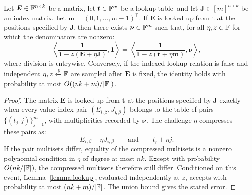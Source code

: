 \begin{corollary}
Let $\bm{E} \in {\mathbb{F}}^{n\times k}$ be a matrix, let
$\bm{t} \in {\mathbb{F}}^m$ be a lookup table, and let
$\bm{J} \in [m]^{n\times k}$ be an index matrix.
Let $\bm{m}=(0,1,\ldots,m-1)^\top$.  If $\bm{E}$ is looked up from
$\bm{t}$ at the positions specified by $\bm{J}$, then there exists
$\bm{\nu} \in {\mathbb{F}}^m$ such that, for all $\eta,z\in{\mathbb{F}}$ for which the
denominators are nonzero:
\[
    \left\langle
    \frac{\bm{1}}{\bm{1}-z(\bm{E}+\eta\bm{J})},
    \bm{1}
    \right\rangle
    =
    \left\langle
    \frac{\bm{1}}{\bm{1}-z(\bm{t}+\eta\bm{m})},
    \bm{\nu}
    \right\rangle,
\]
where division is entrywise. Conversely, if the indexed lookup relation is
false and independent $\eta,z\mathrel{\xleftarrow{\$}}{\mathbb{F}}$ are sampled after $\bm E$ is
fixed, the identity holds with probability at most
$O((nk+m)/|{\mathbb{F}}|)$.
\end{corollary}

\begin{proof}
The matrix $\bm{E}$ is looked up from $\bm{t}$ at the positions specified by
$\bm{J}$ exactly when every value-index pair $(E_{i,\beta},J_{i,\beta})$ belongs
to the table of pairs $\{(t_j,j)\}_{j=1}^m$, with multiplicities recorded by
$\bm{\nu}$.  The challenge $\eta$ compresses these pairs as:
\[
    E_{i,\beta} + \eta J_{i,\beta}
    \qquad\text{and}\qquad
    t_j + \eta j.
\]
If the pair multisets differ, equality of the compressed multisets is a
nonzero polynomial condition in $\eta$ of degree at most $nk$.  Except with
probability $O(nk/|{\mathbb{F}}|)$, the compressed multisets therefore still differ.
Conditioned on this event, Lemma~\ref{lemma:lookup}, evaluated independently at
$z$, accepts with probability at most $(nk+m)/|{\mathbb{F}}|$.  The union bound gives
the stated error.
\end{proof}
